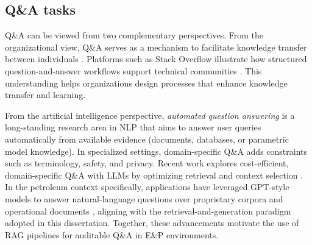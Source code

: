         \subsection{Q\&A tasks}    

            Q\&A can be viewed from two complementary perspectives. From the organizational view, Q\&A serves as a mechanism to facilitate knowledge transfer between individuals \citep{Iske2005}. Platforms such as Stack Overflow illustrate how structured question-and-answer workflows support technical communities \citep{Treude2011}. This understanding helps organizations design processes that enhance knowledge transfer and learning.

            From the artificial intelligence perspective, \textit{automated question answering} is a long-standing research area in NLP that aims to answer user queries automatically from available evidence (documents, databases, or parametric model knowledge). 
            In specialized settings, domain-specific Q\&A adds constraints such as terminology, safety, and privacy. 
            Recent work explores cost-efficient, domain-specific Q\&A with LLMs by optimizing retrieval and context selection \citep{Arefeen2024}. 
            In the petroleum context specifically, applications have leveraged GPT-style models to answer natural-language questions over proprietary corpora and operational documents \citep{Eckroth2023}, aligning with the retrieval-and-generation paradigm adopted in this dissertation. 
            Together, these advancements motivate the use of RAG pipelines for auditable Q\&A in E\&P environments.

